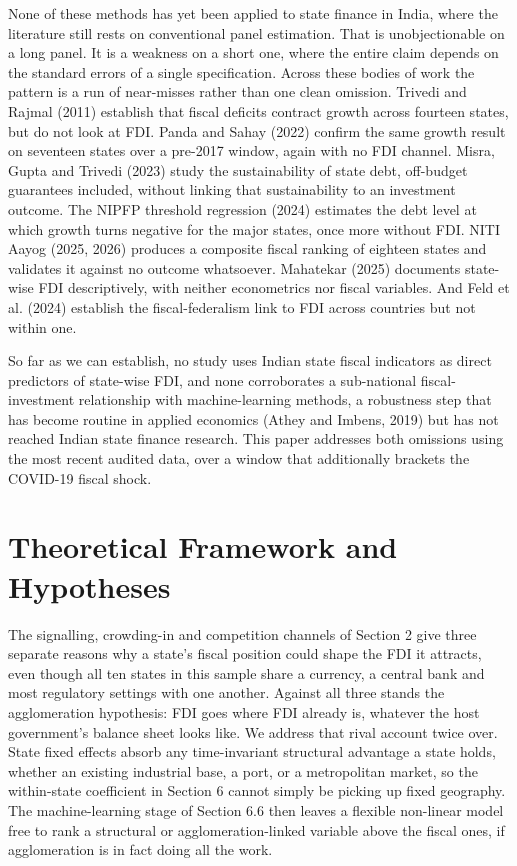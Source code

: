\documentclass[12pt,a4paper]{article}
\begin{document}
None of these methods has yet been applied to state finance in India, where the literature still rests on conventional panel estimation. That is unobjectionable on a long panel. It is a weakness on a short one, where the entire claim depends on the standard errors of a single specification. Across these bodies of work the pattern is a run of near-misses rather than one clean omission. Trivedi and Rajmal (2011) establish that fiscal deficits contract growth across fourteen states, but do not look at FDI. Panda and Sahay (2022) confirm the same growth result on seventeen states over a pre-2017 window, again with no FDI channel. Misra, Gupta and Trivedi (2023) study the sustainability of state debt, off-budget guarantees included, without linking that sustainability to an investment outcome. The NIPFP threshold regression (2024) estimates the debt level at which growth turns negative for the major states, once more without FDI. NITI Aayog (2025, 2026) produces a composite fiscal ranking of eighteen states and validates it against no outcome whatsoever. Mahatekar (2025) documents state-wise FDI descriptively, with neither econometrics nor fiscal variables. And Feld et al. (2024) establish the fiscal-federalism link to FDI across countries but not within one.

So far as we can establish, no study uses Indian state fiscal indicators as direct predictors of state-wise FDI, and none corroborates a sub-national fiscal-investment relationship with machine-learning methods, a robustness step that has become routine in applied economics (Athey and Imbens, 2019) but has not reached Indian state finance research. This paper addresses both omissions using the most recent audited data, over a window that additionally brackets the COVID-19 fiscal shock.

\FloatBarrier
\section{Theoretical Framework and Hypotheses}

The signalling, crowding-in and competition channels of Section 2 give three separate reasons why a state's fiscal position could shape the FDI it attracts, even though all ten states in this sample share a currency, a central bank and most regulatory settings with one another. Against all three stands the agglomeration hypothesis: FDI goes where FDI already is, whatever the host government's balance sheet looks like. We address that rival account twice over. State fixed effects absorb any time-invariant structural advantage a state holds, whether an existing industrial base, a port, or a metropolitan market, so the within-state coefficient in Section 6 cannot simply be picking up fixed geography. The machine-learning stage of Section 6.6 then leaves a flexible non-linear model free to rank a structural or agglomeration-linked variable above the fiscal ones, if agglomeration is in fact doing all the work.
\end{document}
